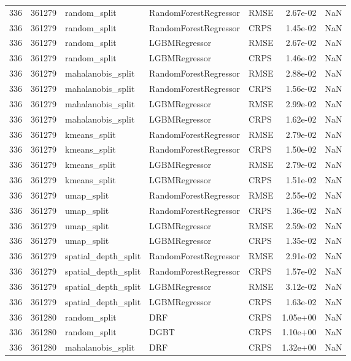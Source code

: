 \begin{tabular}{rrlllrr}
336 & 361279 & random\_split & RandomForestRegressor & RMSE & 2.67e-02 & NaN \\
336 & 361279 & random\_split & RandomForestRegressor & CRPS & 1.45e-02 & NaN \\
336 & 361279 & random\_split & LGBMRegressor & RMSE & 2.67e-02 & NaN \\
336 & 361279 & random\_split & LGBMRegressor & CRPS & 1.46e-02 & NaN \\
336 & 361279 & mahalanobis\_split & RandomForestRegressor & RMSE & 2.88e-02 & NaN \\
336 & 361279 & mahalanobis\_split & RandomForestRegressor & CRPS & 1.56e-02 & NaN \\
336 & 361279 & mahalanobis\_split & LGBMRegressor & RMSE & 2.99e-02 & NaN \\
336 & 361279 & mahalanobis\_split & LGBMRegressor & CRPS & 1.62e-02 & NaN \\
336 & 361279 & kmeans\_split & RandomForestRegressor & RMSE & 2.79e-02 & NaN \\
336 & 361279 & kmeans\_split & RandomForestRegressor & CRPS & 1.50e-02 & NaN \\
336 & 361279 & kmeans\_split & LGBMRegressor & RMSE & 2.79e-02 & NaN \\
336 & 361279 & kmeans\_split & LGBMRegressor & CRPS & 1.51e-02 & NaN \\
336 & 361279 & umap\_split & RandomForestRegressor & RMSE & 2.55e-02 & NaN \\
336 & 361279 & umap\_split & RandomForestRegressor & CRPS & 1.36e-02 & NaN \\
336 & 361279 & umap\_split & LGBMRegressor & RMSE & 2.59e-02 & NaN \\
336 & 361279 & umap\_split & LGBMRegressor & CRPS & 1.35e-02 & NaN \\
336 & 361279 & spatial\_depth\_split & RandomForestRegressor & RMSE & 2.91e-02 & NaN \\
336 & 361279 & spatial\_depth\_split & RandomForestRegressor & CRPS & 1.57e-02 & NaN \\
336 & 361279 & spatial\_depth\_split & LGBMRegressor & RMSE & 3.12e-02 & NaN \\
336 & 361279 & spatial\_depth\_split & LGBMRegressor & CRPS & 1.63e-02 & NaN \\
336 & 361280 & random\_split & DRF & CRPS & 1.05e+00 & NaN \\
336 & 361280 & random\_split & DGBT & CRPS & 1.10e+00 & NaN \\
336 & 361280 & mahalanobis\_split & DRF & CRPS & 1.32e+00 & NaN \\

\end{tabular}
